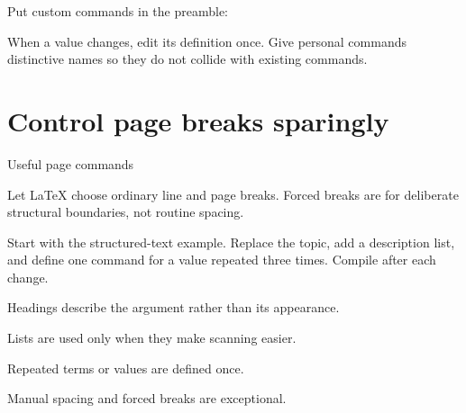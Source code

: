 Put custom commands in the preamble:


When a value changes, edit its definition once. Give personal commands
distinctive names so they do not collide with existing commands.

\section{Control page breaks sparingly}

\begin{latexcode}{Useful page commands}
\newpage      %
\clearpage    %
\end{latexcode}

Let \LaTeX{} choose ordinary line and page breaks. Forced breaks are for
deliberate structural boundaries, not routine spacing.

\begin{codelab}
Start with the structured-text example. Replace the topic, add a description
list, and define one command for a value repeated three times. Compile after
each change.
\end{codelab}

\begin{chapterchecklist}
  \item Headings describe the argument rather than its appearance.
  \item Lists are used only when they make scanning easier.
  \item Repeated terms or values are defined once.
  \item Manual spacing and forced breaks are exceptional.
\end{chapterchecklist}
